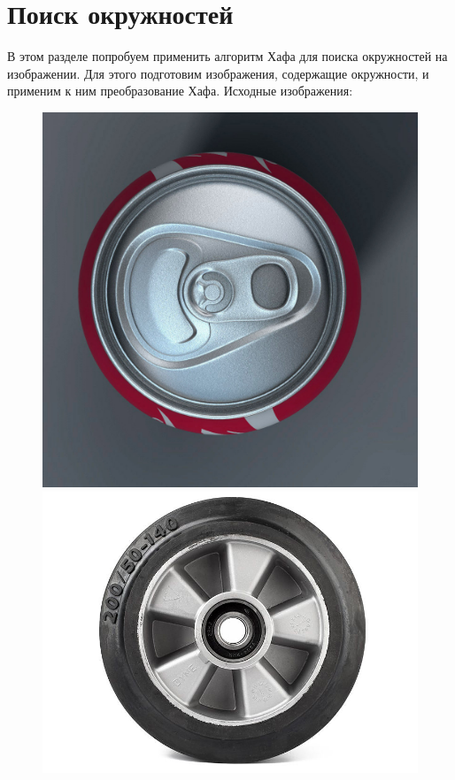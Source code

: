 \documentclass[a4paper,12pt]{article}
\begin{document}
\section{Поиск окружностей}
В этом разделе попробуем применить алгоритм Хафа для поиска окружностей на изображении. Для этого подготовим изображения, содержащие окружности, и применим к ним преобразование Хафа. Исходные изображения:
\begin{figure}[H]
    \centering
    \begin{minipage}{0.48\textwidth}
        \centering
        \includegraphics[width=\textwidth]{images/cola.png}
    \end{minipage}
    \begin{minipage}{0.48\textwidth}
        \centering
        \includegraphics[width=\textwidth]{images/wheel.png}

\end{minipage}
\end{figure}
\end{document}
